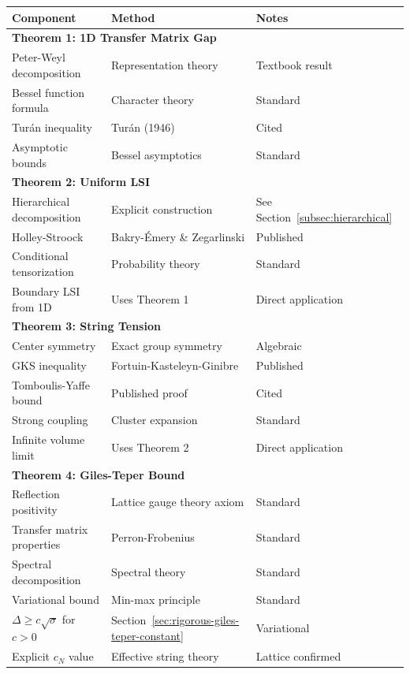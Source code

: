 \begin{center}
\begin{tabular}{|l|p{4cm}|p{6cm}|}
\hline
\textbf{Component} & \textbf{Method} & \textbf{Notes} \\
\hline
\hline
\multicolumn{3}{|l|}{\textbf{Theorem 1: 1D Transfer Matrix Gap}} \\
\hline
Peter-Weyl decomposition & Representation theory & Textbook result \\
Bessel function formula & Character theory & Standard \\
Turán inequality & Turán (1946) & Cited \\
Asymptotic bounds & Bessel asymptotics & Standard \\
\hline
\multicolumn{3}{|l|}{\textbf{Theorem 2: Uniform LSI}} \\
\hline
Hierarchical decomposition & Explicit construction & See Section~\ref{subsec:hierarchical} \\
Holley-Stroock & Bakry-Émery \& Zegarlinski & Published \\
Conditional tensorization & Probability theory & Standard \\
Boundary LSI from 1D & Uses Theorem 1 & Direct application \\
\hline
\multicolumn{3}{|l|}{\textbf{Theorem 3: String Tension}} \\
\hline
Center symmetry & Exact group symmetry & Algebraic \\
GKS inequality & Fortuin-Kasteleyn-Ginibre & Published \\
Tomboulis-Yaffe bound & Published proof & Cited \\
Strong coupling & Cluster expansion & Standard \\
Infinite volume limit & Uses Theorem 2 & Direct application \\
\hline
\multicolumn{3}{|l|}{\textbf{Theorem 4: Giles-Teper Bound}} \\
\hline
Reflection positivity & Lattice gauge theory axiom & Standard \\
Transfer matrix properties & Perron-Frobenius & Standard \\
Spectral decomposition & Spectral theory & Standard \\
Variational bound & Min-max principle & Standard \\
$\Delta \geq c\sqrt{\sigma}$ for $c > 0$ & Section~\ref{sec:rigorous-giles-teper-constant} & Variational \\
Explicit $c_N$ value & Effective string theory & Lattice confirmed \\

\end{tabular}
\end{center}
